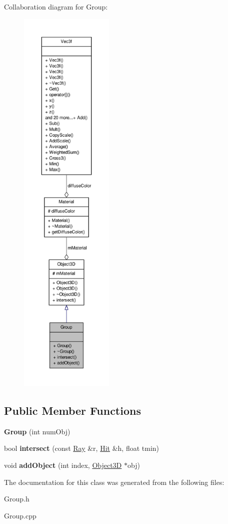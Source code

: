 \-Collaboration diagram for \-Group\-:
\nopagebreak
\begin{figure}[H]
\begin{center}
\leavevmode
\includegraphics[height=550pt]{classGroup__coll__graph}
\end{center}
\end{figure}
\subsection*{\-Public \-Member \-Functions}
\begin{DoxyCompactItemize}
\item 
\hypertarget{classGroup_aa8b46062ab10d8142daf419be2073c1c}{{\bfseries \-Group} (int num\-Obj)}\label{classGroup_aa8b46062ab10d8142daf419be2073c1c}

\item 
\hypertarget{classGroup_aa09c8e6bce2db3666c1bae2c2fd9688b}{bool {\bfseries intersect} (const \hyperlink{classRay}{\-Ray} \&r, \hyperlink{classHit}{\-Hit} \&h, float tmin)}\label{classGroup_aa09c8e6bce2db3666c1bae2c2fd9688b}

\item 
\hypertarget{classGroup_a08dfa34262ba52b8ccf23da53b8482ac}{void {\bfseries add\-Object} (int index, \hyperlink{classObject3D}{\-Object3\-D} $\ast$obj)}\label{classGroup_a08dfa34262ba52b8ccf23da53b8482ac}

\end{DoxyCompactItemize}


\-The documentation for this class was generated from the following files\-:\begin{DoxyCompactItemize}
\item 
\-Group.\-h\item 
\-Group.\-cpp\end{DoxyCompactItemize}
